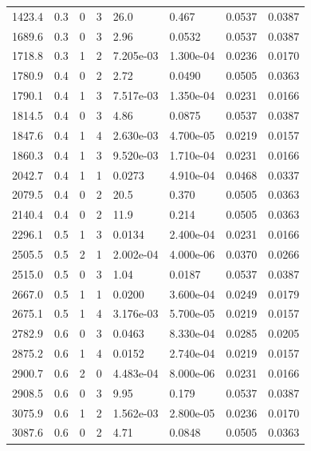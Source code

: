 \documentclass[preview]{standalone}
\begin{document}
{{{\begin{tabular}{L{1.2cm}C{1.2cm} C{0.3cm}C{0.5cm} C{1.4cm}C{1.4cm} C{1.4cm}C{1.4cm}}
  1423.4  &   0.3  & 0     &  3 &  26.0  & 0.467  & 0.0537 &  0.0387   \\ 
  1689.6  &   0.3  & 0     &  3 &  2.96  & 0.0532  & 0.0537 &  0.0387   \\ 
  1718.8  &   0.3  & 1     &  2 &  7.205e-03  & 1.300e-04  & 0.0236 &  0.0170   \\ 
  1780.9  &   0.4  & 0     &  2 &  2.72  & 0.0490  & 0.0505 &  0.0363   \\ 
  1790.1  &   0.4  & 1     &  3 &  7.517e-03  & 1.350e-04  & 0.0231 &  0.0166   \\ 
  1814.5  &   0.4  & 0     &  3 &  4.86  & 0.0875  & 0.0537 &  0.0387   \\ 
  1847.6  &   0.4  & 1     &  4 &  2.630e-03  & 4.700e-05  & 0.0219 &  0.0157   \\ 
  1860.3  &   0.4  & 1     &  3 &  9.520e-03  & 1.710e-04  & 0.0231 &  0.0166   \\ 
  2042.7  &   0.4  & 1     &  1 &  0.0273  & 4.910e-04  & 0.0468 &  0.0337   \\ 
  2079.5  &   0.4  & 0     &  2 &  20.5  & 0.370  & 0.0505 &  0.0363   \\ 
  2140.4  &   0.4  & 0     &  2 &  11.9  & 0.214  & 0.0505 &  0.0363   \\ 
  2296.1  &   0.5  & 1     &  3 &  0.0134  & 2.400e-04  & 0.0231 &  0.0166   \\ 
  2505.5  &   0.5  & 2     &  1 &  2.002e-04  & 4.000e-06  & 0.0370 &  0.0266   \\ 
  2515.0  &   0.5  & 0     &  3 &  1.04  & 0.0187  & 0.0537 &  0.0387   \\ 
  2667.0  &   0.5  & 1     &  1 &  0.0200  & 3.600e-04  & 0.0249 &  0.0179   \\ 
  2675.1  &   0.5  & 1     &  4 &  3.176e-03  & 5.700e-05  & 0.0219 &  0.0157   \\ 
  2782.9  &   0.6  & 0     &  3 &  0.0463  & 8.330e-04  & 0.0285 &  0.0205   \\ 
  2875.2  &   0.6  & 1     &  4 &  0.0152  & 2.740e-04  & 0.0219 &  0.0157   \\ 
  2900.7  &   0.6  & 2     &  0 &  4.483e-04  & 8.000e-06  & 0.0231 &  0.0166   \\ 
  2908.5  &   0.6  & 0     &  3 &  9.95  & 0.179  & 0.0537 &  0.0387   \\ 
  3075.9  &   0.6  & 1     &  2 &  1.562e-03  & 2.800e-05  & 0.0236 &  0.0170   \\ 
  3087.6  &   0.6  & 0     &  2 &  4.71  & 0.0848  & 0.0505 &  0.0363   \\ 

\end{tabular}}}}
\end{document}
